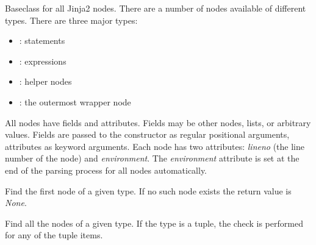 \documentclass[a4paper,10pt,english]{sphinxmanual}
\begin{document}
\begin{fulllineitems}
\label{extensions:jinja2.nodes.Node}
Baseclass for all Jinja2 nodes.  There are a number of nodes available
of different types.  There are three major types:
\begin{itemize}
\item {} 
{\hyperref[extensions:jinja2.nodes.Stmt]{}}: statements

\item {} 
{\hyperref[extensions:jinja2.nodes.Expr]{}}: expressions

\item {} 
{\hyperref[extensions:jinja2.nodes.Helper]{}}: helper nodes

\item {} 
{\hyperref[extensions:jinja2.nodes.Template]{}}: the outermost wrapper node

\end{itemize}

All nodes have fields and attributes.  Fields may be other nodes, lists,
or arbitrary values.  Fields are passed to the constructor as regular
positional arguments, attributes as keyword arguments.  Each node has
two attributes: \emph{lineno} (the line number of the node) and \emph{environment}.
The \emph{environment} attribute is set at the end of the parsing process for
all nodes automatically.

\begin{fulllineitems}
\label{extensions:jinja2.nodes.Node.find}
Find the first node of a given type.  If no such node exists the
return value is \emph{None}.

\end{fulllineitems}


\begin{fulllineitems}
\label{extensions:jinja2.nodes.Node.find_all}
Find all the nodes of a given type.  If the type is a tuple,
the check is performed for any of the tuple items.

\end{fulllineitems}



\end{fulllineitems}
\end{document}
